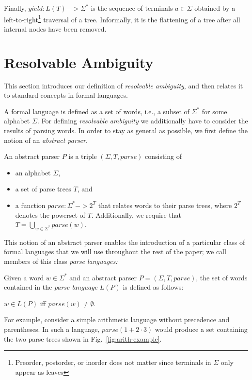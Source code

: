 \documentclass[acmsmall,review,anonymous]{acmart}\settopmatter{printfolios=true,printccs=false,printacmref=false}
\newcommand{\T}{\Sigma} %
\newcommand{\parse}{\mathit{parse}} %
\begin{document}
Finally, $yield : L(T) -> \T^{*}$ is the sequence of terminals $a \in \T$ obtained by a left-to-right\footnote{Preorder, postorder, or inorder does not matter since terminals in $\T$ only appear as leaves} traversal of a tree. Informally, it is the flattening of a tree after all internal nodes have been removed.

\section{Resolvable Ambiguity} \label{sec:resolvable-definition}

This section introduces our definition of \emph{resolvable ambiguity}, and then relates it to standard concepts in formal languages.

A formal language is defined as a set of words, i.e., a subset of $\T^{*}$ for some alphabet $\T$. For defining \emph{resolvable ambiguity} we additionally have to consider the results of parsing words. In order to stay as general as possible, we first define the notion of an \emph{abstract parser}.

\begin{definition}
  An abstract parser $P$ is a triple $(\T, T, \parse)$ consisting of
\begin{itemize}
\item an alphabet $\T$,
\item a set of parse trees $T$, and
\item a function $\parse : \T^{*} -> 2^T$ that relates words to their parse trees, where $2^T$ denotes the powerset of $T$. Additionally, we require that $T = \bigcup_{w \in \T^{*}} \parse(w)$.
\end{itemize}
\end{definition}

This notion of an abstract parser enables the introduction of a particular class of formal languages that we will use throughout the rest of the paper; we call members of this class \emph{parse languages:}

\begin{definition}
  Given a word $w \in \T^{*}$ and an abstract parser $P = (\T, T,
  \parse)$, the set of words contained in the \emph{parse language}
  $L(P)$ is defined as follows:

  $w \in L(P)$ iff $\parse(w) \neq \emptyset$.
\end{definition}

\noindent For example, consider a simple arithmetic language without precedence and parentheses. In such a language, $\parse(1 + 2 \cdot 3)$ would produce a set containing the two parse trees shown in Fig.~\ref{fig:arith-example}.
\end{document}
